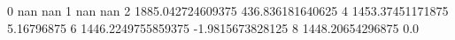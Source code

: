 0 nan nan
1 nan nan
2 1885.042724609375 436.836181640625
4 1453.37451171875 5.16796875
6 1446.2249755859375 -1.9815673828125
8 1448.20654296875 0.0
